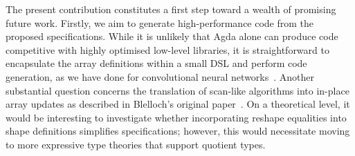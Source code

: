 The present contribution constitutes a first step toward a wealth of promising
future work.  Firstly, we aim to generate high-performance code from the
proposed specifications.  While it is unlikely that Agda alone can produce code
competitive with highly optimised low-level libraries, it is straightforward to
encapsulate the array definitions within a small DSL and perform code
generation, as we have done for convolutional neural
networks~\citep{10.1145/3747524}.  Another substantial question concerns the
translation of scan-like algorithms into in-place array updates as described
in Blelloch's original
paper~\citep{GEBlelloch:prefixsums}.  On a theoretical level, it would be
interesting to investigate whether incorporating reshape equalities into shape
definitions simplifies specifications; however, this would necessitate moving
to more expressive type theories that support quotient types.
